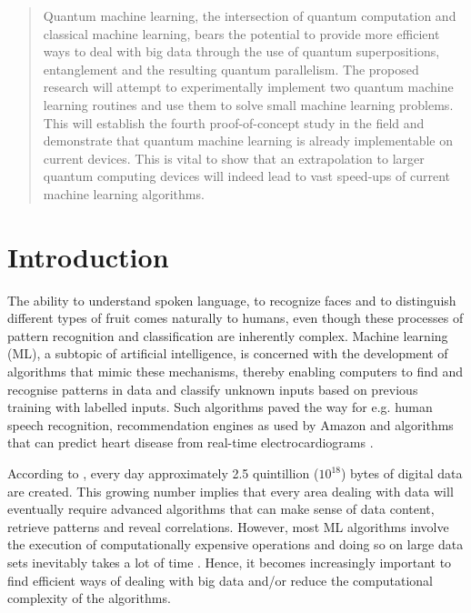 \documentclass[a4paper]{article}
\newcommand*{\0}{$\ket{0}$}
\newcommand*{\1}{$\ket{1}$}
\begin{document}
\vspace{10.0cm}
\begin{abstract}
Quantum machine learning, the intersection of quantum computation and classical machine learning, bears the potential to provide more efficient ways to deal with big data through the use of quantum superpositions, entanglement and the resulting quantum parallelism. The proposed research will attempt to experimentally implement two quantum machine learning routines and use them to solve small machine learning problems. This will establish the fourth proof-of-concept study in the field and demonstrate that quantum machine learning is already implementable on current devices. This is vital to show that an extrapolation to larger quantum computing devices will indeed lead to vast speed-ups of current machine learning algorithms.


\end{abstract}
	\newpage
	\tableofcontents
	\newpage

\section{Introduction}
\label{sec:introduction}


The ability to understand spoken language, to recognize faces and to distinguish different types of fruit comes naturally to humans, even though these processes of pattern recognition and classification are inherently complex. Machine learning (ML), a subtopic of artificial intelligence, is concerned with the development of algorithms that mimic these mechanisms, thereby enabling computers to find and recognise patterns in data and classify unknown inputs based on previous training with labelled inputs. Such algorithms paved the way for e.g. human speech recognition, recommendation engines as used by Amazon and algorithms that can predict heart disease from real-time electrocardiograms \citep{acharya2015integrated, pazzani2007content}.

According to \cite*{bigdata}, every day approximately 2.5 quintillion (${10}^{18}$) bytes of digital data are created. This growing number implies that every area dealing with data will eventually require advanced algorithms that can make sense of data content, retrieve patterns and reveal correlations. However, most ML algorithms involve the execution of computationally expensive operations and doing so on large data sets inevitably takes a lot of time \citep{bekkerman2011scaling}. Hence, it becomes increasingly important to find efficient ways of dealing with big data and/or reduce the computational complexity of the algorithms.
\end{document}
